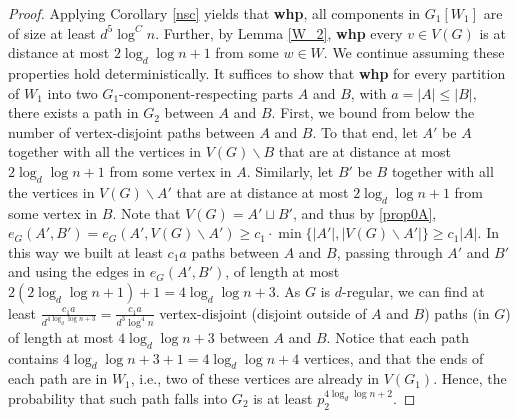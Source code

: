 \documentclass[notitlepage]{scrartcl}
\begin{document}
\begin{proof}
    Applying Corollary \ref{nsc} yields that \textbf{whp}, all components in $G_1[W_1]$ are of size at least $d^5\log^C n$. Further, by Lemma \ref{W_2}, \textbf{whp} every $v\in V(G)$ is at distance at most $2\log_d\log n+1$ from some $w\in W$. We continue assuming these properties hold deterministically.
    It suffices to show that \textbf{whp} for every partition of $W_1$ into two $G_1$-component-respecting parts $A$ and $B$, with $a = |A| \leq |B|$, there exists a path in $G_2$ between $A$ and $B$. First, we bound from below the number of vertex-disjoint paths between $A$ and $B$. To that end, let $A'$ be $A$ together with all the vertices in $V (G)\backslash B$ that are at distance at most $2\log_d\log n+1$ from some vertex in $A$. Similarly, let $B'$ be $B$ together with all the vertices in $V(G)\backslash A'$ that are at distance at most $2\log_d\log n+1$ from some vertex in $B$. Note that $V(G)= A' \sqcup B'$, and thus by \ref{prop0A}, $e_G(A',B')=e_G(A',V(G)\backslash A')\geq c_1\cdot \min\{|A'|,|V(G)\backslash A'|\}\ge c_1|A|$. In this way we built at least $c_1a$ paths between $A$ and $B$, passing through $A'$ and $B'$ and using the edges in $e_G(A',B')$, of length at most $2(2\log_d\log n+1)+1=4\log_d\log n+3$. As $G$ is $d$-regular, we can find at least $\frac{c_1a}{d^{4 \log_d \log n+3}}=\frac{c_1a}{d^3\log^4 n}$ vertex-disjoint (disjoint outside of $A$ and $B$) paths (in $G$) of length at most $4 \log_d \log n+3$ between $A$ and $B$. Notice that each path contains $4\log_d\log n+3+1=4\log_d\log n+4$ vertices, and that the ends of each path are in $W_1$, i.e., two of these vertices are already in $V(G_1)$. Hence, the probability that such path falls into $G_2$ is at least $p_2^{4\log_d\log n+2}$.
    

\end{proof}
\end{document}
